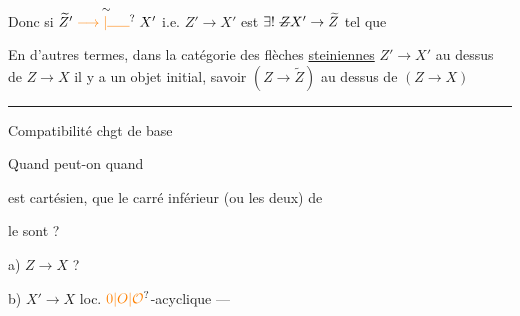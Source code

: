 Donc si $\widetilde Z'\mathrel{\overset{\sim}{\unsure{\longrightarrow|\rule{1.6em}{0.4pt}}}}X'$ i.e. $Z'\to X'$ est \uline{} $\exists!\ \deleted{Z}X'\to\widetilde Z$  tel que


En d'autres termes, dans la catégorie des flèches \uline{steiniennes} $Z'\to X'$  au dessus de $Z\to X$ il y a un objet initial, savoir $(Z\to\widetilde Z)$ au dessus de $(Z\to X)$

\begin{center}\rule{0.16\linewidth}{0.4pt}\end{center}
Compatibilité  chgt de base

Quand peut-on  quand


est cartésien, que le carré inférieur (ou les deux) de


le sont ?

a) $Z\to X$  ?

b) $X'\to X$ loc. $\unsure{0|O|\mathcal O}$-acyclique \quad ---

